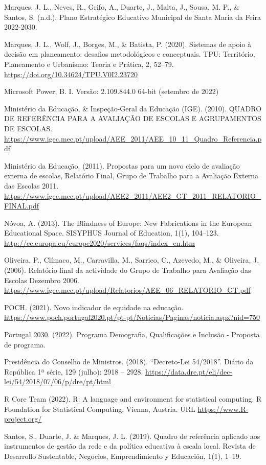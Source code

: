 \documentclass[
]{book}
\begin{document}
Marques, J. L., Neves, R., Grifo, A., Duarte, J., Malta, J., Sousa, M. P., \& Santos, S. (n.d.). Plano Estratégico Educativo Municipal de Santa Maria da Feira 2022-2030.

Marques, J. L., Wolf, J., Borges, M., \& Batista, P. (2020). Sistemas de apoio à decisão em planeamento: desafios metodológicos e conceptuais. TPU: Território, Planeamento e Urbanismo: Teoria e Prática, 2, 52--79. \url{https://doi.org/10.34624/TPU.V0I2.23720}

Microsoft Power, B. I. Versão: 2.109.844.0 64-bit (setembro de 2022)

Ministério da Educação, \& Inspeção-Geral da Educação (IGE). (2010). QUADRO DE REFERÊNCIA PARA A AVALIAÇÃO DE ESCOLAS E AGRUPAMENTOS DE ESCOLAS. \url{https://www.igec.mec.pt/upload/AEE_2011/AEE_10_11_Quadro_Referencia.pdf}

Ministério da Educação. (2011). Propostas para um novo ciclo de avaliação externa de escolas, Relatório Final, Grupo de Trabalho para a Avaliação Externa das Escolas 2011. \url{https://www.igec.mec.pt/upload/AEE2_2011/AEE2_GT_2011_RELATORIO_FINAL.pdf}

Nóvoa, A. (2013). The Blindness of Europe: New Fabrications in the European Educational Space. SISYPHUS Journal of Education, 1(1), 104--123. \url{http://ec.europa.eu/europe2020/services/faqs/index_en.htm}

Oliveira, P., Clímaco, M., Carravilla, M., Sarrico, C., Azevedo, M., \& Oliveira, J. (2006). Relatório final da actividade do Grupo de Trabalho para Avaliação das Escolas Dezembro 2006. \url{https://www.igec.mec.pt/upload/Relatorios/AEE_06_RELATORIO_GT.pdf}

POCH. (2021). Novo indicador de equidade na educação. \url{https://www.poch.portugal2020.pt/pt-pt/Noticias/Paginas/noticia.aspx?nid=750}

Portugal 2030. (2022). Programa Demografia, Qualificações e Inclusão - Proposta de programa.

Presidência do Conselho de Ministros. (2018). ``Decreto-Lei 54/2018''. Diário da República 1ª série, 129 (julho): 2918 -- 2928. \url{https://data.dre.pt/eli/dec-lei/54/2018/07/06/p/dre/pt/html}

R Core Team (2022). R: A language and environment for statistical computing. R Foundation for Statistical Computing, Vienna, Austria. URL \url{https://www.R-project.org/}

Santos, S., Duarte, J. \& Marques, J. L. (2019). Quadro de referência aplicado aos instrumentos de gestão da rede e da política educativa à escala local. Revista de Desarrollo Sustentable, Negocios, Emprendimiento y Educación, 1(1), 1--19.
\end{document}
